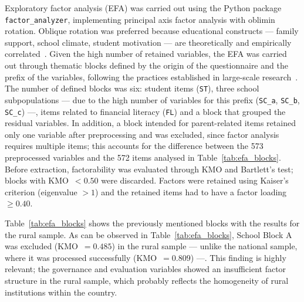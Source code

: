 \documentclass[runningheads]{llncs}
\begin{document}
Exploratory factor analysis (EFA) was carried out using the
Python package \texttt{factor\_analyzer}, implementing principal
axis factor analysis with oblimin rotation. Oblique rotation was
preferred because educational constructs --- family support,
school climate, student motivation --- are theoretically and
empirically correlated~\cite{fabrigar1999efa}. Given the high
number of retained variables, the EFA was carried out through
thematic blocks defined by the origin of the questionnaire and
the prefix of the variables, following the practices established
in large-scale research~\cite{rutkowski2010secondary}. The number
of defined blocks was six: student items (\texttt{ST}), three
school subpopulations --- due to the high number of variables
for this prefix (\texttt{SC\_a}, \texttt{SC\_b},
\texttt{SC\_c}) ---, items related to financial literacy
(\texttt{FL}) and a block that grouped the residual variables.
In addition, a block intended for parent-related items retained
only one variable after preprocessing and was excluded, since
factor analysis requires multiple items; this accounts for the
difference between the 573 preprocessed variables and the 572
items analysed in Table~\ref{tab:efa_blocks}. Before extraction,
factorability was evaluated through KMO and Bartlett's test;
blocks with KMO~$< 0.50$ were discarded. Factors were retained
using Kaiser's criterion (eigenvalue $> 1$) and the retained
items had to have a factor loading $\geq 0.40$.

Table~\ref{tab:efa_blocks} shows the previously mentioned blocks
with the results for the rural sample. As can be observed in
Table~\ref{tab:efa_blocks}, School Block A was excluded
(KMO~$= 0.485$) in the rural sample --- unlike the national
sample, where it was processed successfully (KMO~$= 0.809$) ---.
This finding is highly relevant; the governance and evaluation
variables showed an insufficient factor structure in the rural
sample, which probably reflects the homogeneity of rural
institutions within the country.
\end{document}
